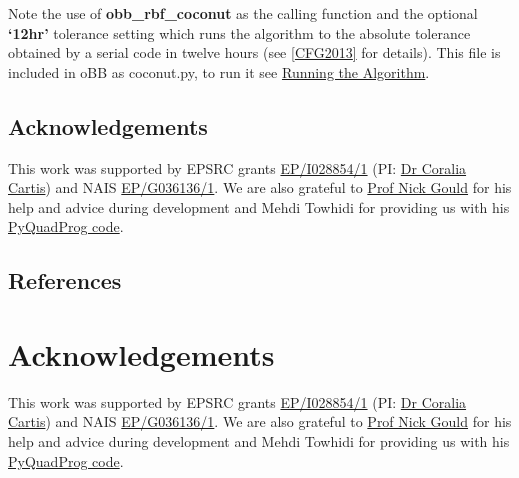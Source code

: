 \documentclass[letterpaper,11pt,openany,oneside]{sphinxmanual}
\begin{document}
Note the use of \textbf{obb\_rbf\_coconut} as the calling function and the optional \textbf{`12hr'} tolerance setting which runs the algorithm to the absolute tolerance obtained by a serial code in twelve hours (see {\hyperref[userguide:cfg2013]{{[}CFG2013{]}}} for details). This file is included in oBB as coconut.py, to run it see {\hyperref[userguide:running-the-algorithm]{Running the Algorithm}}.


\section{Acknowledgements}
\label{userguide:acknowledgements}
This work was supported by EPSRC grants \href{http://gow.epsrc.ac.uk/NGBOViewGrant.aspx?GrantRef=EP/I028854/1}{EP/I028854/1} (PI: \href{http://www.maths.ox.ac.uk/people/profiles/coralia.cartis}{Dr Coralia Cartis}) and NAIS \href{http://gow.epsrc.ac.uk/NGBOViewGrant.aspx?GrantRef=EP/G036136/1}{EP/G036136/1}.
We are also grateful to \href{http://www.numerical.rl.ac.uk/people/nimg/}{Prof Nick Gould} for his help and advice during development and Mehdi Towhidi for providing us with his \href{http://github.com/mpy/PyQuadProg}{PyQuadProg code}.


\section{References}
\label{userguide:references}

\chapter{Acknowledgements}
\label{index:acknowledgements}
This work was supported by EPSRC grants \href{http://gow.epsrc.ac.uk/NGBOViewGrant.aspx?GrantRef=EP/I028854/1}{EP/I028854/1} (PI: \href{http://www.maths.ox.ac.uk/people/profiles/coralia.cartis}{Dr Coralia Cartis}) and NAIS \href{http://gow.epsrc.ac.uk/NGBOViewGrant.aspx?GrantRef=EP/G036136/1}{EP/G036136/1}.
We are also grateful to \href{http://www.numerical.rl.ac.uk/people/nimg/}{Prof Nick Gould} for his help and advice during development and Mehdi Towhidi for providing us with his \href{http://github.com/mpy/PyQuadProg}{PyQuadProg code}.

\begin{thebibliography}{CFG2013}
\end{thebibliography}



\renewcommand{\indexname}{Index}
\printindex
\end{document}

